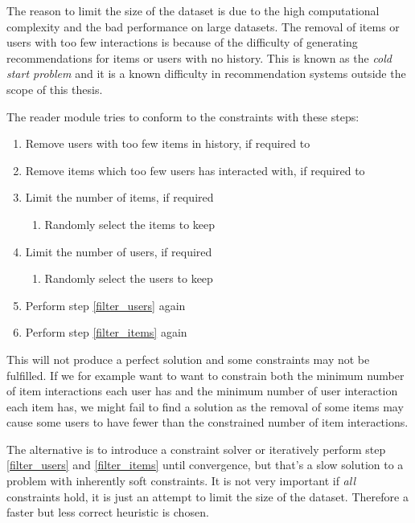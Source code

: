The reason to limit the size of the dataset is due to the high computational complexity and the bad performance on large datasets. The removal of items or users with too few interactions is because of the difficulty of generating recommendations for items or users with no history. This is known as the \textit{cold start problem} and it is a known difficulty in recommendation systems \citep{cacheda2011comparison} outside the scope of this thesis.

The reader module tries to conform to the constraints with these steps:

\begin{enumerate}
    \item \label{filter_users} Remove users with too few items in history, if required to
    \item \label{filter_items} Remove items which too few users has interacted with, if required to

    \item Limit the number of items, if required
        \begin{enumerate}
            \item Randomly select the items to keep
        \end{enumerate}
    \item Limit the number of users, if required
        \begin{enumerate}
            \item Randomly select the users to keep
        \end{enumerate}

    \item Perform step \ref{filter_users} again
    \item Perform step \ref{filter_items} again
\end{enumerate}

This will not produce a perfect solution and some constraints may not be fulfilled. If we for example want to want to constrain both the minimum number of item interactions each user has and the minimum number of user interaction each item has, we might fail to find a solution as the removal of some items may cause some users to have fewer than the constrained number of item interactions.

The alternative is to introduce a constraint solver or iteratively perform step \ref{filter_users} and \ref{filter_items} until convergence, but that's a slow solution to a problem with inherently soft constraints. It is not very important if \textit{all} constraints hold, it is just an attempt to limit the size of the dataset. Therefore a faster but less correct heuristic is chosen.

